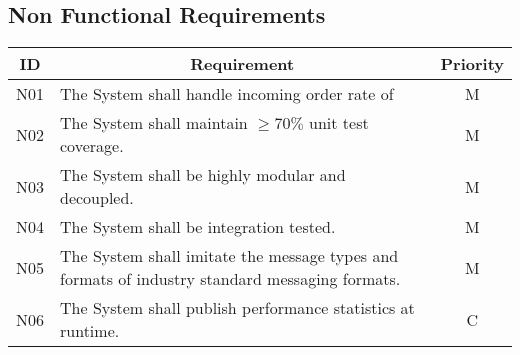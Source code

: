 \subsection{Non Functional Requirements}
\begin{table}[htbp]
\begin{center}
\begin{longtable}{c p{4.2in} c }

\multicolumn{1}{c}{\textbf{ID}}           &
\multicolumn{1}{c}{\textbf{Requirement}}  &
\multicolumn{1}{c}{\textbf{Priority}}     \\        
\toprule

N01  & The System shall handle incoming order rate of              & M \\ 
N02  & The System shall maintain $\geq70\%$ unit test coverage.    & M \\
N03  & The System shall be highly modular and decoupled.           & M \\
N04  & The System shall be integration tested.	                   & M \\
N05  & The System shall imitate the message types and formats of industry standard messaging formats. & M \\
N06  & The System shall publish performance statistics at runtime. & C \\

         
\end{longtable}
\end{center}
\end{table}

